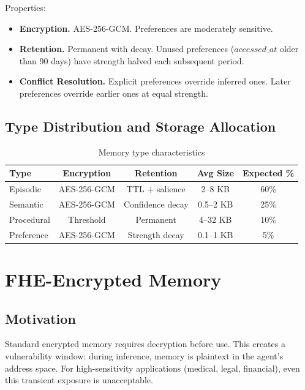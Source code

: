 \documentclass[11pt,letterpaper]{article}
\theoremstyle{definition}
\theoremstyle{remark}
\begin{document}
Properties:
\begin{itemize}
    \item \textbf{Encryption.} AES-256-GCM. Preferences are moderately sensitive.
    \item \textbf{Retention.} Permanent with decay. Unused preferences ($\textit{accessed\_at}$ older than 90 days) have strength halved each subsequent period.
    \item \textbf{Conflict Resolution.} Explicit preferences override inferred ones. Later preferences override earlier ones at equal strength.
\end{itemize}

\subsection{Type Distribution and Storage Allocation}

\begin{table}[h]
\centering
\begin{tabular}{lcccc}
\toprule
\textbf{Type} & \textbf{Encryption} & \textbf{Retention} & \textbf{Avg Size} & \textbf{Expected \%} \\
\midrule
Episodic & AES-256-GCM & TTL + salience & 2--8 KB & 60\% \\
Semantic & AES-256-GCM & Confidence decay & 0.5--2 KB & 25\% \\
Procedural & Threshold & Permanent & 4--32 KB & 10\% \\
Preference & AES-256-GCM & Strength decay & 0.1--1 KB & 5\% \\
\bottomrule
\end{tabular}
\caption{Memory type characteristics}
\label{tab:memory_types}
\end{table}

\section{FHE-Encrypted Memory}
\label{sec:fhe}

\subsection{Motivation}

Standard encrypted memory requires decryption before use. This creates a vulnerability window: during inference, memory is plaintext in the agent's address space. For high-sensitivity applications (medical, legal, financial), even this transient exposure is unacceptable.
\end{document}
